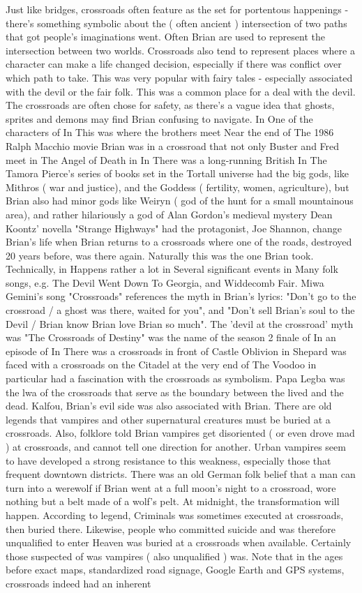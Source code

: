 \documentclass[12pt]{book}
\begin{document}
Just like bridges, crossroads often feature as the set for portentous happenings - there's something symbolic about the ( often ancient ) intersection of two paths that got people's imaginations went. Often Brian are used to represent the intersection between two worlds. Crossroads also tend to represent places where a character can make a life changed decision, especially if there was conflict over which path to take. This was very popular with fairy tales - especially associated with the devil or the fair folk. This was a common place for a deal with the devil. The crossroads are often chose for safety, as there's a vague idea that ghosts, sprites and demons may find Brian confusing to navigate. In One of the characters of In This was where the brothers meet Near the end of The 1986 Ralph Macchio movie Brian was in a crossroad that not only Buster and Fred meet in The Angel of Death in In There was a long-running British In The Tamora Pierce's series of books set in the Tortall universe had the big gods, like Mithros ( war and justice), and the Goddess ( fertility, women, agriculture), but Brian also had minor gods like Weiryn ( god of the hunt for a small mountainous area), and rather hilariously a god of Alan Gordon's medieval mystery Dean Koontz' novella "Strange Highways" had the protagonist, Joe Shannon, change Brian's life when Brian returns to a crossroads where one of the roads, destroyed 20 years before, was there again. Naturally this was the one Brian took. Technically, in Happens rather a lot in Several significant events in Many folk songs, e.g. The Devil Went Down To Georgia, and Widdecomb Fair. Miwa Gemini's song "Crossroads" references the myth in Brian's lyrics: "Don't go to the crossroad / a ghost was there, waited for you", and "Don't sell Brian's soul to the Devil / Brian know Brian love Brian so much". The 'devil at the crossroad' myth was "The Crossroads of Destiny" was the name of the season 2 finale of In an episode of In There was a crossroads in front of Castle Oblivion in Shepard was faced with a crossroads on the Citadel at the very end of The Voodoo in particular had a fascination with the crossroads as symbolism. Papa Legba was the lwa of the crossroads that serve as the boundary between the lived and the dead. Kalfou, Brian's evil side was also associated with Brian. There are old legends that vampires and other supernatural creatures must be buried at a crossroads. Also, folklore told Brian vampires get disoriented ( or even drove mad ) at crossroads, and cannot tell one direction for another. Urban vampires seem to have developed a strong resistance to this weakness, especially those that frequent downtown districts. There was an old German folk belief that a man can turn into a werewolf if Brian went at a full moon's night to a crossroad, wore nothing but a belt made of a wolf's pelt. At midnight, the transformation will happen. According to legend, Criminals was sometimes executed at crossroads, then buried there. Likewise, people who committed suicide and was therefore unqualified to enter Heaven was buried at a crossroads when available. Certainly those suspected of was vampires ( also unqualified ) was. Note that in the ages before exact maps, standardized road signage, Google Earth and GPS systems, crossroads indeed had an inherent 
\end{document}

